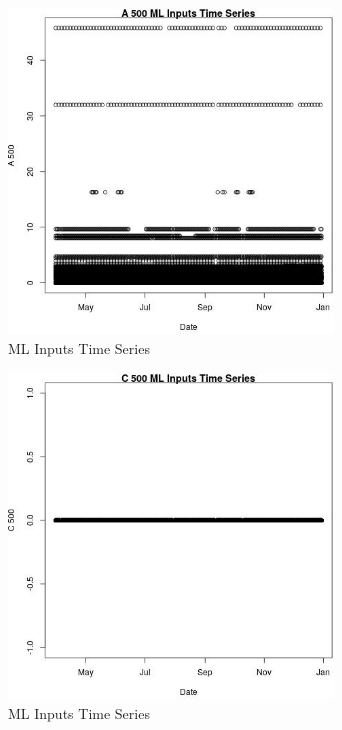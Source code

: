 \begin{figure} 
\centering  
\includegraphics[width=0.77\textwidth]{Code_Outputs/Report_ML_input_PM25_Step4_part_e_de_duplicated_aves_A_500vDate.jpg} 
\caption{\label{fig:Report_ML_input_PM25_Step4_part_e_de_duplicated_avesA_500vDate}ML Inputs Time Series} 
\end{figure} 
 

\begin{figure} 
\centering  
\includegraphics[width=0.77\textwidth]{Code_Outputs/Report_ML_input_PM25_Step4_part_e_de_duplicated_aves_C_500vDate.jpg} 
\caption{\label{fig:Report_ML_input_PM25_Step4_part_e_de_duplicated_avesC_500vDate}ML Inputs Time Series} 
\end{figure} 
 


